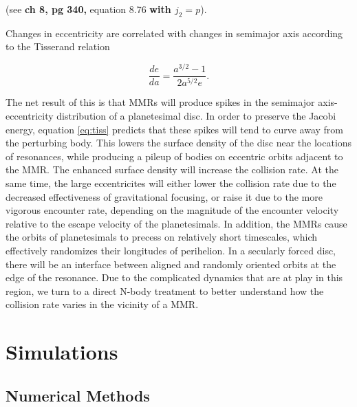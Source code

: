 \documentclass[fleqn,usenatbib]{mnras}
\begin{document}
\noindent (see \citet{1999ssd..book.....M} \textbf{ch 8, pg 340,} equation 8.76 \textbf{with $j_{2} = p$}).

Changes in eccentricity are correlated with changes in semimajor axis according to the Tisserand relation

\begin{equation}\label{eq:tiss}
	\frac{de}{da} = \frac{a^{3/2} - 1}{2 a^{5/2} e}.
\end{equation}

The net result of this is that MMRs will produce spikes in the semimajor axis-eccentricity distribution of a planetesimal disc. In order to 
preserve the Jacobi energy, equation \ref{eq:tiss} predicts that these spikes will tend to curve away from the perturbing body. This lowers the 
surface density of the disc near the locations of resonances, while producing a pileup of bodies on eccentric orbits adjacent to the MMR. The 
enhanced surface density will increase the collision rate. At the same time, the large eccentricites will either lower the collision rate due to the decreased 
effectiveness of gravitational focusing, or raise it due to the more vigorous encounter rate, depending on the magnitude of the encounter velocity relative to 
the escape velocity of the planetesimals. In addition, the MMRs cause the orbits of planetesimals to precess on relatively short 
timescales, which effectively randomizes their longitudes of perihelion. In a secularly forced disc, there will be an interface between aligned 
and randomly oriented orbits at the edge of the resonance. Due to the complicated dynamics that are at play in this region, we turn to a direct 
N-body treatment to better understand how the collision rate varies in the vicinity of a MMR.

\section{Simulations} \label{sec:sims}

\subsection{Numerical Methods}\label{sec:methods}
\end{document}

